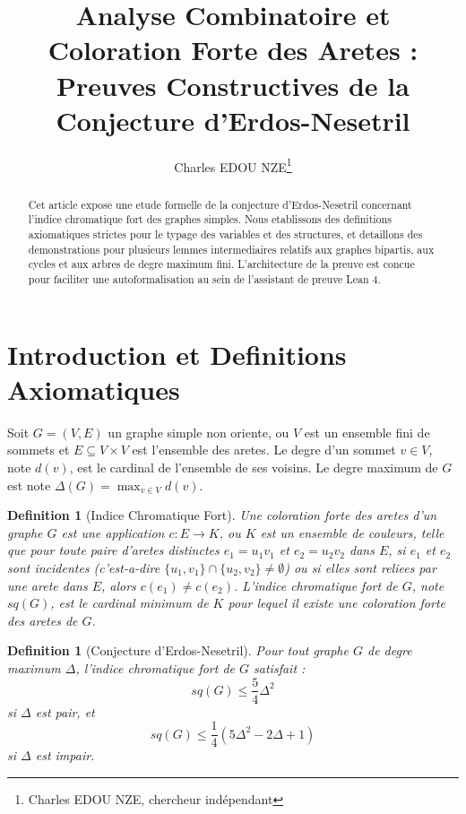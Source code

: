 \documentclass[11pt,a4paper]{article}
\title{Analyse Combinatoire et Coloration Forte des Aretes : Preuves Constructives de la Conjecture d'Erdos-Nesetril}
\author{Charles EDOU NZE\thanks{Charles EDOU NZE, chercheur indépendant}}
\date{}
\newtheorem{definition}[theorem]{Definition}
\begin{document}
\maketitle

\begin{abstract}
Cet article expose une etude formelle de la conjecture d'Erdos-Nesetril concernant l'indice chromatique fort des graphes simples. Nous etablissons des definitions axiomatiques strictes pour le typage des variables et des structures, et detaillons des demonstrations pour plusieurs lemmes intermediaires relatifs aux graphes bipartis, aux cycles et aux arbres de degre maximum fini. L'architecture de la preuve est concue pour faciliter une autoformalisation au sein de l'assistant de preuve Lean 4.
\end{abstract}

\tableofcontents

\section{Introduction et Definitions Axiomatiques}

Soit $G = (V, E)$ un graphe simple non oriente, ou $V$ est un ensemble fini de sommets et $E \subseteq V \times V$ est l'ensemble des aretes. Le degre d'un sommet $v \in V$, note $d(v)$, est le cardinal de l'ensemble de ses voisins. Le degre maximum de $G$ est note $\Delta(G) = \max_{v \in V} d(v)$.

\begin{definition}[Indice Chromatique Fort]
Une coloration forte des aretes d'un graphe $G$ est une application $c : E \to K$, ou $K$ est un ensemble de couleurs, telle que pour toute paire d'aretes distinctes $e_1 = u_1 v_1$ et $e_2 = u_2 v_2$ dans $E$, si $e_1$ et $e_2$ sont incidentes (c'est-a-dire $\{u_1, v_1\} \cap \{u_2, v_2\} \neq \emptyset$) ou si elles sont reliees par une arete dans $E$, alors $c(e_1) \neq c(e_2)$.
L'indice chromatique fort de $G$, note $sq(G)$, est le cardinal minimum de $K$ pour lequel il existe une coloration forte des aretes de $G$.
\end{definition}

\begin{definition}[Conjecture d'Erdos-Nesetril]
Pour tout graphe $G$ de degre maximum $\Delta$, l'indice chromatique fort de $G$ satisfait :
$$ sq(G) \leq \frac{5}{4} \Delta^2 $$
si $\Delta$ est pair, et
$$ sq(G) \leq \frac{1}{4} (5\Delta^2 - 2\Delta + 1) $$
si $\Delta$ est impair.
\end{definition}
\end{document}
